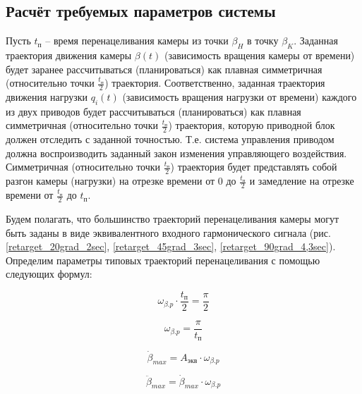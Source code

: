 \subsection{Расчёт требуемых параметров системы}

Пусть $t_\textit{п}$ – время перенацеливания камеры из точки $\beta_{H}$ в точку $\beta_{K}$.
Заданная траектория движения камеры $\beta(t)$ (зависимость вращения камеры от времени)
будет заранее рассчитываться (планироваться) как плавная симметричная
(относительно точки $\frac{t_\textit{п} }{2}$) траектория.
Соответственно, заданная траектория движения нагрузки $q_{i}(t)$
(зависимость вращения нагрузки от времени) каждого из двух приводов будет рассчитываться
(планироваться) как плавная симметричная (относительно точки $\frac{t_\textit{п} }{2}$)
траектория, которую приводной блок должен отследить с заданной точностью.
Т.е. система управления приводом должна воспроизводить заданный закон изменения управляющего
воздействия.
Симметричная (относительно точки $\frac{t_\textit{п} }{2}$) траектория будет представлять
собой разгон камеры (нагрузки) на отрезке времени от 0 до $\frac{t_\textit{п} }{2}$
и замедление на отрезке времени от $\frac{t_\textit{п} }{2}$ до $t_\textit{п}$.

Будем полагать, что большинство траекторий перенацеливания камеры могут быть заданы
в виде эквивалентного входного гармонического сигнала
(рис. \ref{retarget_20grad_2sec},
      \ref{retarget_45grad_3sec},
      \ref{retarget_90grad_4,3sec}).
Определим параметры типовых траекторий перенацеливания с помощью следующих формул:

\begin{equation}
    \label{retarget_angle}
    \omega_{\beta.p} \cdot \frac{t_\textit{п} }{2} = \frac{\pi}{2}
\end{equation}

\begin{equation}
    \label{equiv_signal_frequency}
    \omega_{\beta.p} = \frac{\pi}{t_\textit{п} }
\end{equation}

\begin{equation}
    \label{max_speed_for_equiv_signal}
    \dot{\beta}_{max} = A_\textit{экв} \cdot \omega_{\beta.p}
\end{equation}

\begin{equation}
    \label{max_acceleration_for_equiv_signal}
    \ddot{\beta}_{max} = \dot{\beta}_{max} \cdot \omega_{\beta.p}
\end{equation}

